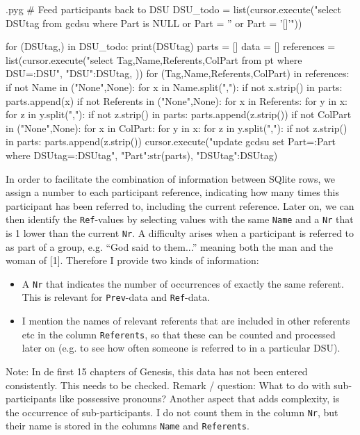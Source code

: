 \documentclass{report}
\makeatletter
\newcommand{\mi}[1]{\lstinline{#1}}
\newenvironment{python}{%
  \VerbatimEnvironment
  \minted@resetoptions
  \setkeys{minted@opt}{}
      \begin{VerbatimOut}{\jobname.pyg}}
{%
      \end{VerbatimOut}
      \minted@pygmentize{python}
      \DeleteFile{\jobname.pyg}}
\makeatother
\begin{document}
\begin{python}
# Feed participants back to DSU
DSU_todo = list(cursor.execute("select DSUtag from gcdsu where Part is NULL or Part = '' or Part = '[]'"))

for (DSUtag,) in DSU_todo:
    print(DSUtag)
    parts = []
    data = []
    references = list(cursor.execute("select Tag,Name,Referents,ColPart from pt where DSU=:DSU", {"DSU":DSUtag, }))
    for (Tag,Name,Referents,ColPart) in references:
        if not Name in ("None",None):
            for x in Name.split(","):
                if not x.strip() in parts:
                    parts.append(x)
        if not Referents in ("None",None):
            for x in Referents:
                for y in x:
                    for z in y.split(","):
                        if not z.strip() in parts:
                            parts.append(z.strip())
        if not ColPart in ("None",None):
            for x in ColPart:
                for y in x:
                    for z in y.split(","):
                        if not z.strip() in parts:
                            parts.append(z.strip())
    cursor.execute("update gcdsu set Part=:Part where DSUtag=:DSUtag", {"Part":str(parts), "DSUtag":DSUtag})

\end{python}

In order to facilitate the combination of information between SQlite rows,
we assign a number to each participant reference, indicating how many times
this participant has been referred to, including the current reference.
Later on, we can then identify the \mi{Ref}-values by selecting values with the
same \mi{Name} and a \mi{Nr} that is 1 lower than the current \mi{Nr}.
A difficulty arises when a participant is referred to as part of a group,
e.g. ``God said to them...'' meaning both the man and the woman of [1].
Therefore I provide two kinds of information:
\begin{itemize}
\item A \mi{Nr} that indicates the number of occurrences of exactly the same referent. This is relevant for \mi{Prev}-data and \mi{Ref}-data.
\item I mention the names of relevant referents that are included in other referents etc in the column \mi{Referents}, so that these can be counted and processed later on (e.g. to see how often someone is referred to in a particular DSU).
\end{itemize}
Note: In de first 15 chapters of Genesis, this data has not been entered consistently. This needs to be checked.
Remark / question: What to do with sub-participants like possessive pronouns?
Another aspect that adds complexity, is the occurrence of sub-participants.
I do not count them in the column \mi{Nr}, but their name is stored in the columns
\mi{Name} and \mi{Referents}.
\end{document}

